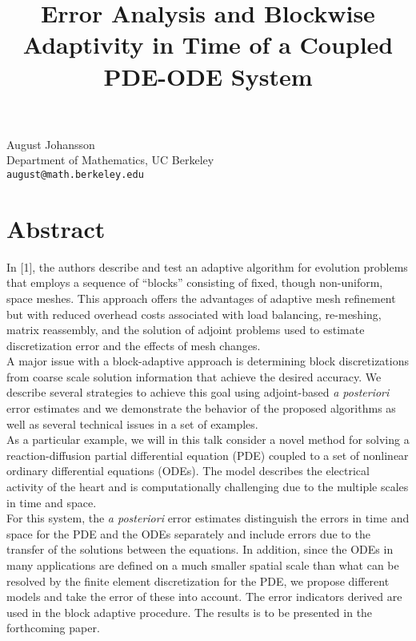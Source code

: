 \documentclass[article,A4,11pt]{llncs}%
\begin{document}
\title{Error Analysis and Blockwise Adaptivity in Time of a Coupled PDE-ODE System}
 \author{} \institute{}
\maketitle
\begin{center}
{\large August  Johansson}\\
Department of Mathematics, UC Berkeley\\
{\tt august@math.berkeley.edu}
\end{center}

\section*{Abstract}
In [1], the authors describe and test an adaptive algorithm for evolution problems that employs a sequence of ``blocks'' consisting of fixed, though non-uniform, space meshes. This approach offers the advantages of adaptive mesh refinement but with reduced overhead costs associated with load balancing, re-meshing, matrix reassembly, and the solution of adjoint problems used to estimate discretization error and the effects of mesh changes.\\

A major issue with a block-adaptive approach is determining block discretizations from coarse scale solution information that achieve the desired accuracy. We describe several strategies to achieve this goal using adjoint-based {\em a posteriori} error estimates and we demonstrate the behavior of the proposed algorithms as well as several technical issues in a set of examples.\\

As a particular example, we will in this talk consider a novel method for solving a reaction-diffusion partial differential equation (PDE) coupled to a set of nonlinear ordinary differential equations (ODEs). The model describes the electrical activity of the heart and is computationally challenging due to the multiple scales in time and space.\\

For this system, the {\em a posteriori} error estimates distinguish the errors in time and space for the PDE and the ODEs separately and include errors due to the transfer of the solutions between the equations. In addition, since the ODEs in many applications are defined on a much smaller spatial scale than what can be resolved by the finite element discretization for the PDE, we propose different models and take the error of these into account. The error indicators derived are used in the block adaptive procedure. The results is to be presented in the forthcoming paper.
\end{document}
